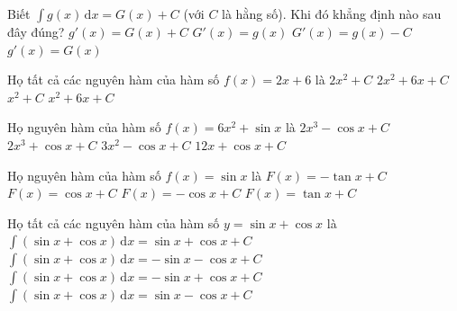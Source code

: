 \begin{ex}%
	Biết $\displaystyle\int g(x)\mathrm{\,d}x=G(x)+C$ (với $C$ là hằng số). Khi đó khẳng định nào sau đây đúng?
	\choice
	{$g'(x)=G(x)+C$}
	{\True $G'(x)=g(x)$}
	{$G'(x)=g(x)-C$}
	{$g'(x)=G(x)$}
\end{ex}

\begin{ex}%
	Họ tất cả các nguyên hàm của hàm số $f(x)=2x+6$ là
	\choice
	{$2x^2+C$}
	{$2x^2+6x+C$}
	{$x^2+C$}
	{\True $x^2+6x+C$}
\end{ex}

\begin{ex}%
	Họ nguyên hàm của hàm số $f(x)=6x^2+\sin x$ là
	\choice
	{\True $2x^3-\cos x+C$}
	{$2x^3+\cos x+C$}
	{$3x^2-\cos x+C$}
	{$12x+\cos x+C$}
\end{ex}

\begin{ex}%
	Họ nguyên hàm của hàm số $f(x)=\sin x$ là
	\choice
	{$F(x)=-\tan x+C$}
	{$F(x)=\cos x+C$}
	{\True $F(x)=-\cos x+C$}
	{$F(x)=\tan x+C$}
\end{ex}

\begin{ex}%
	Họ tất cả các nguyên hàm của hàm số $y = \sin x + \cos x$ là
	\choice
	{$\displaystyle\int (\sin x + \cos x)\mathrm{\,d}x = \sin x + \cos x + C$}
	{$\displaystyle\int (\sin x + \cos x)\mathrm{\,d}x = -\sin x - \cos x + C$}
	{$\displaystyle\int (\sin x + \cos x)\mathrm{\,d}x = -\sin x + \cos x + C$}
	{\True $\displaystyle\int (\sin x + \cos x)\mathrm{\,d}x = \sin x - \cos x + C$}
\end{ex}

